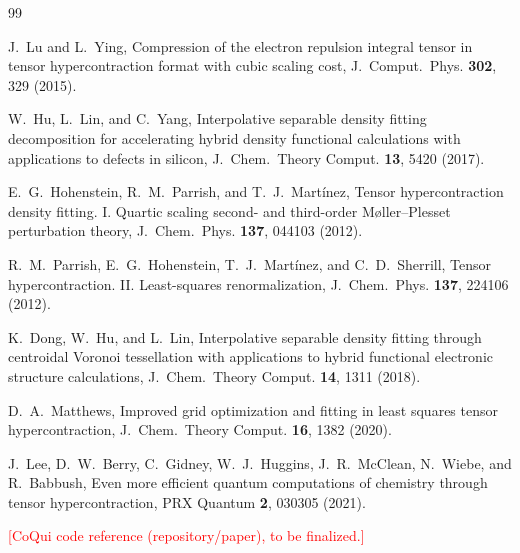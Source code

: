 \documentclass[aps,prb,twocolumn,superscriptaddress,amsmath,amssymb]{revtex4-2}
\newcommand{\todo}[1]{\textcolor{red}{[#1]}}
\begin{document}
\begin{thebibliography}{99}

J.~Lu and L.~Ying,
Compression of the electron repulsion integral tensor in tensor
hypercontraction format with cubic scaling cost,
J.~Comput.~Phys. \textbf{302}, 329 (2015).

W.~Hu, L.~Lin, and C.~Yang,
Interpolative separable density fitting decomposition for accelerating
hybrid density functional calculations with applications to defects in
silicon,
J.~Chem.~Theory Comput. \textbf{13}, 5420 (2017).

E.~G.~Hohenstein, R.~M.~Parrish, and T.~J.~Mart\'inez,
Tensor hypercontraction density fitting. I. Quartic scaling second- and
third-order M{\o}ller--Plesset perturbation theory,
J.~Chem.~Phys. \textbf{137}, 044103 (2012).

R.~M.~Parrish, E.~G.~Hohenstein, T.~J.~Mart\'inez, and C.~D.~Sherrill,
Tensor hypercontraction. II. Least-squares renormalization,
J.~Chem.~Phys. \textbf{137}, 224106 (2012).

K.~Dong, W.~Hu, and L.~Lin,
Interpolative separable density fitting through centroidal Voronoi
tessellation with applications to hybrid functional electronic structure
calculations,
J.~Chem.~Theory Comput. \textbf{14}, 1311 (2018).

D.~A.~Matthews,
Improved grid optimization and fitting in least squares tensor
hypercontraction,
J.~Chem.~Theory Comput. \textbf{16}, 1382 (2020).

J.~Lee, D.~W.~Berry, C.~Gidney, W.~J.~Huggins, J.~R.~McClean, N.~Wiebe,
and R.~Babbush,
Even more efficient quantum computations of chemistry through tensor
hypercontraction,
PRX Quantum \textbf{2}, 030305 (2021).

\todo{CoQui code reference (repository/paper), to be finalized.}

\end{thebibliography}
\end{document}
